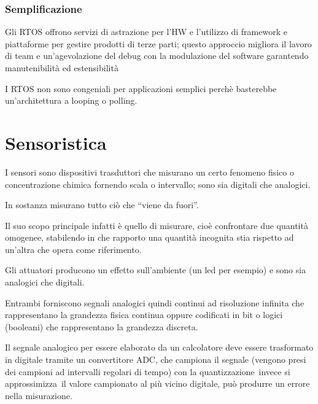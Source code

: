 \documentclass[
]{article}
\begin{document}
{}

\subsubsection{\texorpdfstring{{Semplificazione}}{Semplificazione}}\label{h.1y3fkr23l5qv}

{Gli RTOS offrono servizi di astrazione per l'HW e l'utilizzo di
framework e piattaforme per gestire prodotti di terze parti; questo
approccio migliora il lavoro di team e un'agevolazione del debug con la
modulazione del software garantendo manutenibilità ed estensibilità}

{}

{I RTOS non sono congeniali per applicazioni semplici perchè basterebbe
un'architettura a looping o polling.}

{}

{}

{}

\section{\texorpdfstring{{Sensoristica}}{Sensoristica}}\label{h.6n3uemvvs09h}

{I }{sensori }{sono dispositivi trasduttori che misurano un certo
fenomeno fisico o concentrazione chimica fornendo scala o intervallo;
sono sia digitali che analogici.}

{In sostanza misurano tutto ciò che ``viene da fuori''.}

{Il suo scopo principale infatti è quello di misurare, cioè confrontare
due quantità omogenee, stabilendo in che rapporto una quantità incognita
stia rispetto ad un'altra che opera come riferimento. }

{Gli }{attuatori }{producono un effetto sull'ambiente (un led per
esempio) e sono sia analogici che digitali.}

{}

{Entrambi forniscono segnali analogici quindi continui ad risoluzione
infinita che rappresentano la grandezza fisica continua oppure
codificati in bit o logici (booleani) che rappresentano la grandezza
discreta.}

{Il segnale analogico per essere elaborato da un calcolatore deve essere
trasformato in digitale tramite un }{convertitore ADC}{, che campiona il
segnale (vengono presi dei campioni ad intervalli regolari di tempo) con
la }{quantizzazione}{~invece si }{approssimizza}{~il valore campionato
al più vicino digitale, può produrre un errore nella misurazione.}
\end{document}
